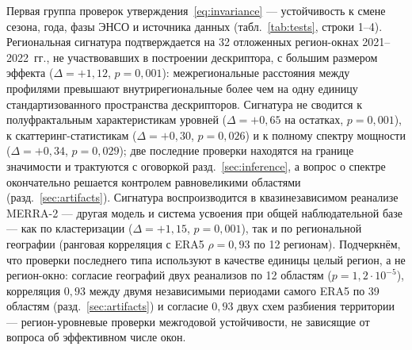 \documentclass[11pt,a4paper]{article}
\begin{document}
Первая группа проверок утверждения~\eqref{eq:invariance} --- устойчивость к смене сезона, года, фазы ЭНСО и источника данных (табл.~\ref{tab:tests}, строки 1--4). Региональная сигнатура подтверждается на 32 отложенных регион-окнах 2021--2022~гг., не участвовавших в построении дескриптора, с большим размером эффекта ($\Delta=+1{,}12$, $p=0{,}001$): межрегиональные расстояния между профилями превышают внутрирегиональные более чем на одну единицу стандартизованного пространства дескрипторов. Сигнатура не сводится к полуфрактальным характеристикам уровней ($\Delta=+0{,}65$ на остатках, $p=0{,}001$), к скаттеринг-статистикам ($\Delta=+0{,}30$, $p=0{,}026$) и к полному спектру мощности ($\Delta=+0{,}34$, $p=0{,}029$); две последние проверки находятся на границе значимости и трактуются с оговоркой разд.~\ref{sec:inference}, а вопрос о спектре окончательно решается контролем равновеликими областями (разд.~\ref{sec:artifacts}). Сигнатура воспроизводится в квазинезависимом реанализе MERRA-2 --- другая модель и система усвоения при общей наблюдательной базе --- как по кластеризации ($\Delta=+1{,}15$, $p=0{,}001$), так и по региональной географии (ранговая корреляция с ERA5 $\rho=0{,}93$ по 12 регионам). Подчеркнём, что проверки последнего типа используют в качестве единицы целый регион, а не регион-окно: согласие географий двух реанализов по 12 областям ($p=1{,}2\cdot10^{-5}$), корреляция $0{,}93$ между двумя независимыми периодами самого ERA5 по 39 областям (разд.~\ref{sec:artifacts}) и согласие $0{,}93$ двух схем разбиения территории --- регион-уровневые проверки межгодовой устойчивости, не зависящие от вопроса об эффективном числе окон.
\end{document}
